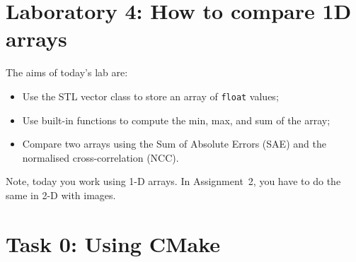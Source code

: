\documentclass[english,a4paper,12pt,oneside]{article}
\begin{document}

\section*{Laboratory 4: How to compare 1D arrays}

%
%
%
%    
%    

The aims of today's lab are:
\begin{itemize}
	\item Use the STL vector class to store an array of \verb+float+ values;
	\item Use built-in functions to compute the min, max, and sum of the array;
	\item Compare two arrays using the Sum of Absolute Errors (SAE) and the normalised cross-correlation (NCC).
\end{itemize}

Note, today you work using 1-D arrays. In Assignment~2, you have to do the same in 2-D with images.

\section*{Task 0: Using CMake}
\end{document}
